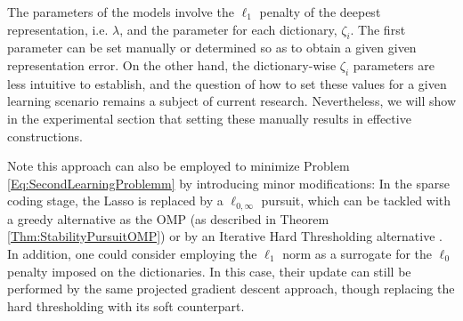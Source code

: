 \documentclass[10pt,journal]{IEEEtran}
\theoremstyle{plain}
\theoremstyle{definition}
\begin{document}
The parameters of the models involve the $\ell_1$ penalty of the deepest representation, i.e. $\lambda$, and the parameter for each dictionary, $\zeta_i$. The first parameter can be set manually or determined so as to obtain a given given representation error. On the other hand, the dictionary-wise $\zeta_i$ parameters are less intuitive to establish, and the question of how to set these values for a given learning scenario remains a subject of current research. Nevertheless, we will show in the experimental section that setting these manually results in effective constructions.

Note this approach can also be employed to minimize Problem \eqref{Eq:SecondLearningProblemm} by introducing minor modifications: In the sparse coding stage, the Lasso is replaced by a $\ell_{0,\infty}$ pursuit, which can be tackled with a greedy alternative as the OMP (as described in Theorem \ref{Thm:StabilityPursuitOMP}) or by an Iterative Hard Thresholding alternative \cite{Blumensath2008}. In addition, one could consider employing the $\ell_1$ norm as a surrogate for the $\ell_0$ penalty imposed on the dictionaries. In this case, their update can still be performed by the same projected gradient descent approach, though replacing the hard thresholding with its soft counterpart.
\end{document}
